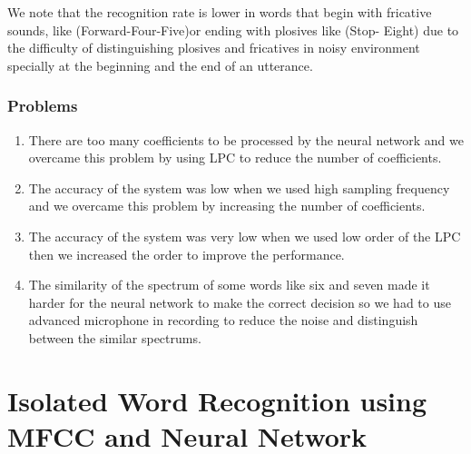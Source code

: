 \documentclass[12pt, a4paper, twoside]{report}
\begin{document}
We note that the recognition rate is lower in words that begin with fricative sounds, like (Forward-Four-Five)or ending with plosives like (Stop- Eight) due to the difficulty of distinguishing plosives and fricatives  in noisy environment specially at the beginning and the end of an utterance.

\subsubsection{Problems}
\begin{enumerate}[noitemsep]
\item There are too many coefficients to be processed by the neural network and we overcame this problem by using LPC to reduce the number of coefficients.
\item The accuracy of the system was low when we used high sampling frequency and we overcame this problem by increasing the number of coefficients.
\item The accuracy of the system was very low when we used low order of the LPC then we increased the order to improve the performance.
\item The similarity of the spectrum of some words like six and seven made it harder for the neural network to make the correct decision so we had to use advanced microphone in recording to reduce the noise and distinguish between the similar spectrums.
\end{enumerate}

\section{Isolated Word Recognition using MFCC and Neural Network}
\end{document}
